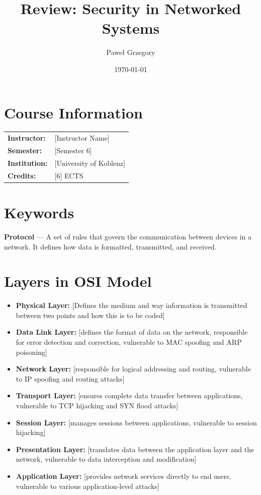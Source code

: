 \documentclass[12pt,a4paper]{article}
\title{Review: Security in Networked Systems}
\author{Paweł Grzegory}
\date{\today}
\begin{document}
\maketitle

\section*{Course Information}
\begin{tabular}{ll}
    \textbf{Instructor:} & [Instructor Name] \\
    \textbf{Semester:} & [Semester 6] \\
    \textbf{Institution:} & [University of Koblenz] \\
    \textbf{Credits:} & [6] ECTS \\
\end{tabular}

\section*{Keywords}
\textbf{Protocol} --- A set of rules that govern the communication between devices in a network. It defines how data is formatted, transmitted, and received.


\section*{Layers in OSI Model}
\begin{itemize}
    \item \textbf{Physical Layer:} [Defines the medium and way information is transmitted between two points and how this is to be coded]
    \item \textbf{Data Link Layer:} [defines the format of data on the network, responsible for error detection and correction, vulnerable to MAC spoofing and ARP poisoning]
    \item \textbf{Network Layer:} [responsible for logical addressing and routing, vulnerable to IP spoofing and routing attacks]
    \item \textbf{Transport Layer:} [ensures complete data transfer between applications, vulnerable to TCP hijacking and SYN flood attacks]
    \item \textbf{Session Layer:} [manages sessions between applications, vulnerable to session hijacking]
    \item \textbf{Presentation Layer:} [translates data between the application layer and the network, vulnerable to data interception and modification]
    \item \textbf{Application Layer:} [provides network services directly to end users, vulnerable to various application-level attacks]
\end{itemize}
\end{document}
